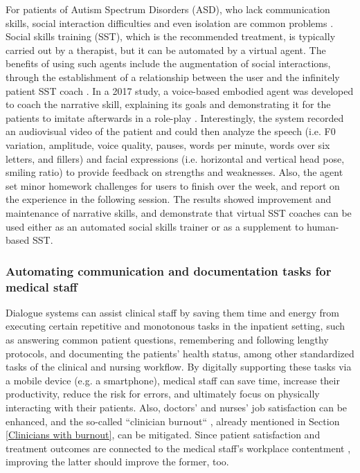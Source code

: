 For patients of Autism Spectrum Disorders (ASD), who lack communication skills, social interaction difficulties and even isolation are common problems \cite{ecaforautism2017}. Social skills training (SST), which is the recommended treatment, is typically carried out by a therapist, but it can be automated by a virtual agent. The benefits of using such agents include the augmentation of social interactions, through the establishment of a relationship between the user and the infinitely patient SST coach \cite{FitTrack2003}. In a 2017 study, a voice-based embodied agent was developed to coach the narrative skill, explaining its goals and demonstrating it for the patients to imitate afterwards in a role-play \cite{ecaforautism2017}. Interestingly, the system recorded an audiovisual video of the patient and could then analyze the speech (i.e. F0 variation, amplitude, voice quality, pauses, words per minute, words over six letters, and fillers) and facial expressions (i.e. horizontal and vertical head pose, smiling ratio) to provide feedback on strengths and weaknesses. Also, the agent set minor homework challenges for users to finish over the week, and report on the experience in the following session. The results showed improvement and maintenance of narrative skills, and demonstrate that virtual SST coaches can be used either as an automated social skills trainer or as a supplement to human-based SST.

\subsubsection{Automating communication and documentation tasks for medical staff}
Dialogue systems can assist clinical staff by saving them time and energy from executing certain repetitive and monotonous tasks in the inpatient setting, such as answering common patient questions, remembering and following lengthy protocols, and documenting the patients' health status, among other standardized tasks of the clinical and nursing workflow. By digitally supporting these tasks via a mobile device (e.g. a smartphone), medical staff can save time, increase their productivity, reduce the risk for errors, and ultimately focus on physically interacting with their patients. Also, doctors' and nurses' job satisfaction can be enhanced, and the so-called ``clinician burnout`` , already mentioned in Section \ref{Clinicians with burnout}, can be mitigated. Since patient satisfaction and treatment outcomes are connected to the medical staff's workplace contentment \cite{delgadillo2018}, improving the latter should improve the former, too. 


